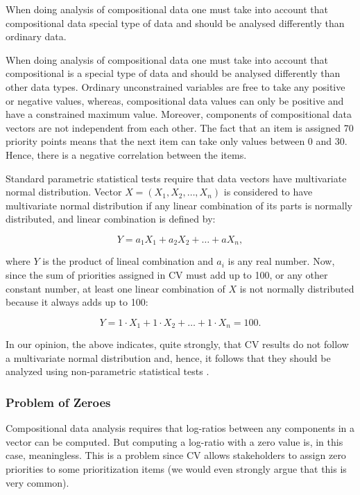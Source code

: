 When doing analysis of compositional data one must take into account that compositional data special type of data
and should be analysed differently than ordinary data.

When doing analysis of compositional data one must take into account that compositional is a special type of data and should be analysed differently than other data types.
Ordinary unconstrained variables are free to take any positive or negative values,
whereas, compositional data values can only be positive and have a constrained maximum value.
Moreover, components of compositional data vectors are not independent from each other.
The fact that an item is assigned 70 priority points means that the next item can take only values between 0 and 30.
Hence, there is a negative correlation between the items.

Standard parametric statistical tests require that data vectors have multivariate normal distribution.
Vector $X=(X_{1}, X_{2}, \ldots, X_{n})$
is considered to have multivariate normal distribution if any linear
combination of its parts is normally distributed, and linear combination
is defined by:

\begin{equation}
	Y=a_{1}X_{1}+a_{2}X_{2}+\ldots+aX_{n},
\end{equation}

where $Y$ is the product of lineal combination and $a_{i}$ is any
real number. Now, since the sum of priorities assigned in CV must add up
to 100, or any other constant number, at least one linear combination
of $X$ is not normally distributed because it always adds up to
100:

\begin{equation}
	Y=1\cdot X_{1}+1\cdot X_{2}+\ldots+1\cdot X_{n}=100.
\end{equation}

In our opinion, the above indicates, quite strongly, that CV results do not follow a multivariate normal distribution and, hence, it follows that they should be analyzed using non-parametric statistical tests \cite{Pawlowsky-Glahn2006}.

\subsubsection{\label{Problem-of-Zeroes}Problem of Zeroes}
Compositional data analysis requires that log-ratios between any components in a vector can be
computed. But computing a log-ratio with a zero value is, in this case, meaningless. This is
a problem since CV allows stakeholders to assign zero priorities
to some prioritization items (we would even strongly argue that this is very common). 

